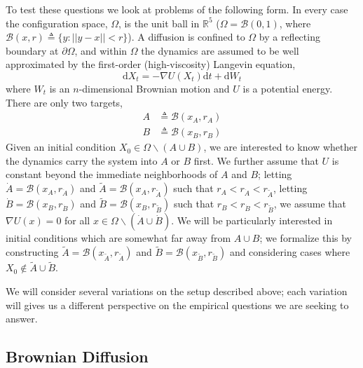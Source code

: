 \documentclass[12pt, nofootinbib,english, amsmath, amssymb, aps, priprint, graphicx,floatfix,draft]{revtex4-1}
\newcommand{\nin}{\not\in}
\theoremstyle{plain}
\theoremstyle{definition}
\theoremstyle{plain}
\newcommand{\bb}[1]{\mathcal{B}\left(#1\right)}
\newcommand{\dA}{{\dot A}}
\newcommand{\tA}{{\tilde A}}
\newcommand{\dB}{{\dot B}}
\newcommand{\tB}{{\tilde B}}
\begin{document}
To test these questions we look at problems of the following form.  In every case the configuration space,
$\Omega$, is the unit ball in $\mathbb{R}^5$
($\Omega = \bb{0,1}$, where $\bb{x, r} \triangleq \{ y : || y - x || < r \}$). A diffusion is confined to $\Omega$ by a reflecting boundary at $\partial\Omega$, and within $\Omega$ the dynamics are assumed to be well approximated by the first-order (high-viscosity) Langevin equation,
\begin{equation}
\label{equ:toy_sde}
\mathrm{d} X_t = - \nabla U (X_t) \mathrm{d} t + \mathrm{d} W_t
\end{equation}
where $W_t$ is an $n$-dimensional Brownian motion and
$U$ is a potential energy. There are only two targets,
\begin{align*}
A &\triangleq \bb {x_A, r_A}\\
B &\triangleq \bb {x_B, r_B}
\end{align*}
Given an initial condition $X_0\in \Omega \backslash (A\cup B)$, we are interested to know whether the dynamics carry the system into $A$ or $B$ first.  We further assume that $U$ is constant beyond the immediate neighborhoods of $A$ and $B$; letting $\dA=\bb{x_A,r_\dA }$ and $\tA=\bb{x_A,r_\tA }$ such that $r_A<r_\dA<r_\tA$, letting $\dB=\bb{x_B,r_\dB }$ and  $\tB=\bb{x_B,r_\tB}$ such that $r_B<r_\dB<r_\tB$, we assume that $\nabla U(x)=0$ for all $x\in\Omega\backslash (\dA\cup\dB)$.  We will be particularly interested in initial conditions which are somewhat far away from $A\cup B$; we formalize this by constructing $\tA=\bb{x_\tA, r_\tA}$ and $\tB=\bb{x_\tB, r_\tB}$ and considering cases where $X_0 \nin \tA \cup \tB$.

We will consider several variations on the setup described above; each variation will gives us a different perspective on the empirical questions we are seeking to answer.  
\subsection{Brownian Diffusion}
\label{sec:B_D}
\end{document}
